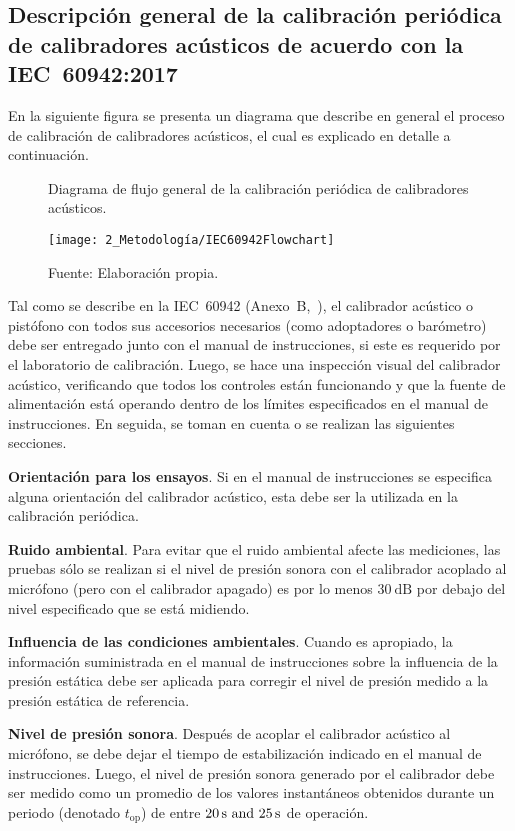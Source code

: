 \subsection{Descripción general de la calibración periódica de calibradores acústicos de acuerdo con la \mbox{IEC 60942:2017}}
\label{subsec:acoustic_calibrators_calibration_description}

En la siguiente figura se presenta un diagrama que describe en general el proceso de calibración de calibradores acústicos, el cual es explicado en detalle a continuación.
%
\begin{figure}[h]
    \caption{Diagrama de flujo general de la calibración periódica de calibradores acústicos.}
    \label{fig:acoustic_calibrator_calibration_flowchart}
    \centering
    \texttt{[image: 2\_Metodología/IEC60942Flowchart]}
    \caption*{\footnotesize Fuente: Elaboración propia.}
\end{figure}

Tal como se describe en la \mbox{IEC 60942} (\mbox{Anexo B},~\citeyear{IEC_TC29_2017}), el calibrador acústico o pistófono con todos sus accesorios necesarios (como adoptadores o barómetro) debe ser entregado junto con el manual de instrucciones, si este es requerido por el laboratorio de calibración.
Luego, se hace una inspección visual del calibrador acústico, verificando que todos los controles están funcionando y que la fuente de alimentación está operando dentro de los límites especificados en el manual de instrucciones.
En seguida, se toman en cuenta o se realizan las siguientes secciones.

\textbf{Orientación para los ensayos}.
Si en el manual de instrucciones se especifica alguna orientación del calibrador acústico, esta debe ser la utilizada en la calibración periódica.

\textbf{Ruido ambiental}.
Para evitar que el ruido ambiental afecte las mediciones, las pruebas sólo se realizan si el nivel de presión sonora con el calibrador acoplado al micrófono (pero con el calibrador apagado) es por lo menos $\qty{30}{\dB}$ por debajo del nivel especificado que se está midiendo.

\textbf{Influencia de las condiciones ambientales}.
Cuando es apropiado, la información suministrada en el manual de instrucciones sobre la influencia de la presión estática debe ser aplicada para corregir el nivel de presión medido a la presión estática de referencia.

\textbf{Nivel de presión sonora}.
Después de acoplar el calibrador acústico al micrófono, se debe dejar el tiempo de estabilización indicado en el manual de instrucciones.
Luego, el nivel de presión sonora generado por el calibrador debe ser medido como un promedio de los valores instantáneos obtenidos durante un periodo (denotado $t_{\mathrm{op}}$) de entre $\qtylist{20;25}{\s}$ de operación.

